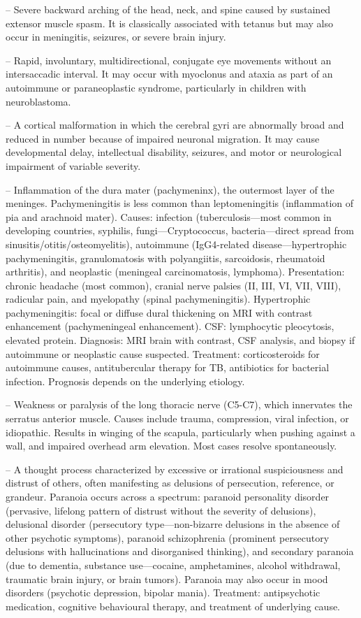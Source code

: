 -- Severe backward arching of the head, neck, and spine caused by sustained extensor muscle spasm. It is classically associated with tetanus but may also occur in meningitis, seizures, or severe brain injury.

-- Rapid, involuntary, multidirectional, conjugate eye movements without an intersaccadic interval. It may occur with myoclonus and ataxia as part of an autoimmune or paraneoplastic syndrome, particularly in children with neuroblastoma.

-- A cortical malformation in which the cerebral gyri are abnormally broad and reduced in number because of impaired neuronal migration. It may cause developmental delay, intellectual disability, seizures, and motor or neurological impairment of variable severity.

-- Inflammation of the dura mater (pachymeninx), the outermost layer of the meninges. Pachymeningitis is less common than leptomeningitis (inflammation of pia and arachnoid mater). Causes: infection (tuberculosis—most common in developing countries, syphilis, fungi—Cryptococcus, bacteria—direct spread from sinusitis/otitis/osteomyelitis), autoimmune (IgG4-related disease—hypertrophic pachymeningitis, granulomatosis with polyangiitis, sarcoidosis, rheumatoid arthritis), and neoplastic (meningeal carcinomatosis, lymphoma). Presentation: chronic headache (most common), cranial nerve palsies (II, III, VI, VII, VIII), radicular pain, and myelopathy (spinal pachymeningitis). Hypertrophic pachymeningitis: focal or diffuse dural thickening on MRI with contrast enhancement (pachymeningeal enhancement). CSF: lymphocytic pleocytosis, elevated protein. Diagnosis: MRI brain with contrast, CSF analysis, and biopsy if autoimmune or neoplastic cause suspected. Treatment: corticosteroids for autoimmune causes, antitubercular therapy for TB, antibiotics for bacterial infection. Prognosis depends on the underlying etiology.

-- Weakness or paralysis of the long thoracic nerve (C5-C7), which innervates the serratus anterior muscle. Causes include trauma, compression, viral infection, or idiopathic. Results in winging of the scapula, particularly when pushing against a wall, and impaired overhead arm elevation. Most cases resolve spontaneously.

-- A thought process characterized by excessive or irrational suspiciousness and distrust of others, often manifesting as delusions of persecution, reference, or grandeur. Paranoia occurs across a spectrum: paranoid personality disorder (pervasive, lifelong pattern of distrust without the severity of delusions), delusional disorder (persecutory type—non-bizarre delusions in the absence of other psychotic symptoms), paranoid schizophrenia (prominent persecutory delusions with hallucinations and disorganised thinking), and secondary paranoia (due to dementia, substance use—cocaine, amphetamines, alcohol withdrawal, traumatic brain injury, or brain tumors). Paranoia may also occur in mood disorders (psychotic depression, bipolar mania). Treatment: antipsychotic medication, cognitive behavioural therapy, and treatment of underlying cause.

